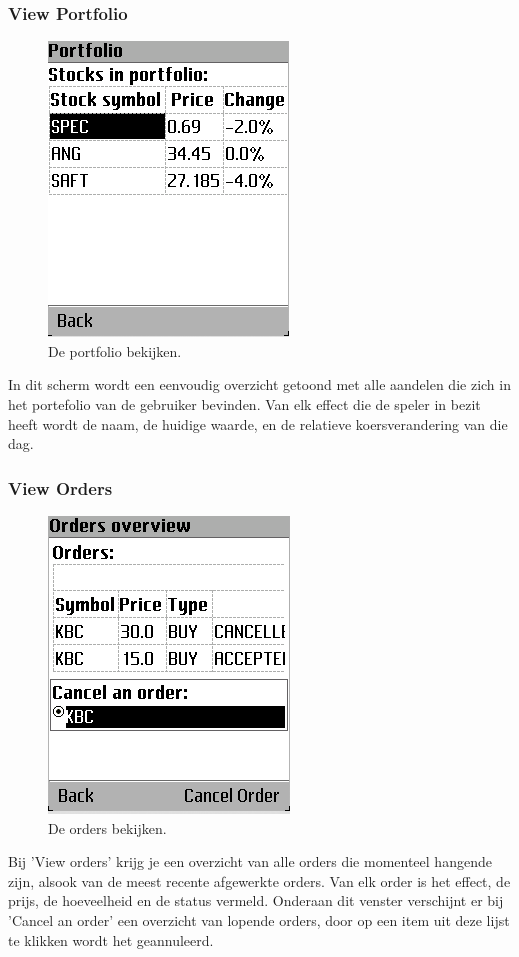 \subsubsection{View Portfolio}
\begin{figure}[h!]
	\centering
		\includegraphics[scale=0.75]{images/handleiding/mobile/Portfolio}
	\caption{De portfolio bekijken.}
	\label{fig:handl:mobile:portfolio}
\end{figure}
In dit scherm wordt een eenvoudig overzicht getoond met alle aandelen die zich in het portefolio van de gebruiker bevinden. Van elk effect die de speler in bezit heeft wordt de naam, de huidige waarde, en de relatieve  koersverandering van die dag.

\subsubsection{View Orders}
\begin{figure}[h!]
	\centering
		\includegraphics[scale=0.75]{images/handleiding/mobile/Orders}
	\caption{De orders bekijken.}
	\label{fig:handl:mobile:orders}
\end{figure}
Bij 'View orders' krijg je een overzicht van alle orders die momenteel hangende zijn, alsook van de meest recente afgewerkte orders. Van elk order is het effect, de prijs, de hoeveelheid en de status vermeld.
Onderaan dit venster verschijnt er bij 'Cancel an order' een overzicht van lopende orders, door op een item uit deze lijst te klikken wordt het geannuleerd.

